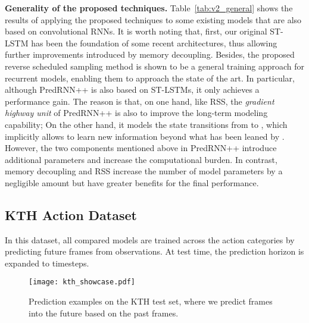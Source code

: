 \documentclass[10pt,journal,compsoc]{IEEEtran}
\newcommand{\tab}[1]{Table~\ref{#1}}
\newcommand{\myparagraph}[1]{\vspace{5pt} \noindent \textbf{#1.}}
\begin{document}
\myparagraph{Generality of the proposed techniques}
\tab{tab:v2_general} shows the results of applying the proposed techniques to some existing models that are also based on convolutional RNNs. It is worth noting that, first, our original ST-LSTM has been the foundation of some recent architectures, thus allowing further improvements introduced by memory decoupling.
Besides, the proposed reverse scheduled sampling method is shown to be a general training approach for recurrent models, enabling them to approach the state of the art.
In particular, although PredRNN++ is also based on ST-LSTMs, it only achieves a  performance gain. The reason is that, on one hand, like RSS, the \textit{gradient highway unit} of PredRNN++ is also to improve the long-term modeling capability; On the other hand, it models the state transitions from  to , which implicitly allows  to learn new information beyond what has been leaned by . 
However, the two components mentioned above in PredRNN++ introduce additional parameters and increase the computational burden. In contrast, memory decoupling and RSS increase the number of model parameters by a negligible amount but have greater benefits for the final performance.



\subsection{KTH Action Dataset}

In this dataset, all compared models are trained across the  action categories by predicting  future frames from  observations. At test time, the prediction horizon is expanded to  timesteps. 



\begin{figure*}[t]
  \centering
  \texttt{[image: kth\_showcase.pdf]}
  \vskip -0.05in
  \caption{Prediction examples on the KTH test set, where we predict  frames into the future based on the past  frames.}
  \label{fig:kth_results}
  \vspace{-10pt}
\end{figure*} 
\end{document}
